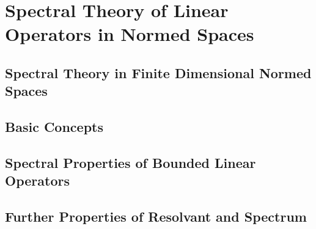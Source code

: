 \section{Spectral Theory of Linear Operators in Normed Spaces}
\subsection{Spectral Theory in Finite Dimensional Normed Spaces}
\subsection{Basic Concepts}
\subsection{Spectral Properties of Bounded Linear Operators}
\subsection{Further Properties of Resolvant and Spectrum}

